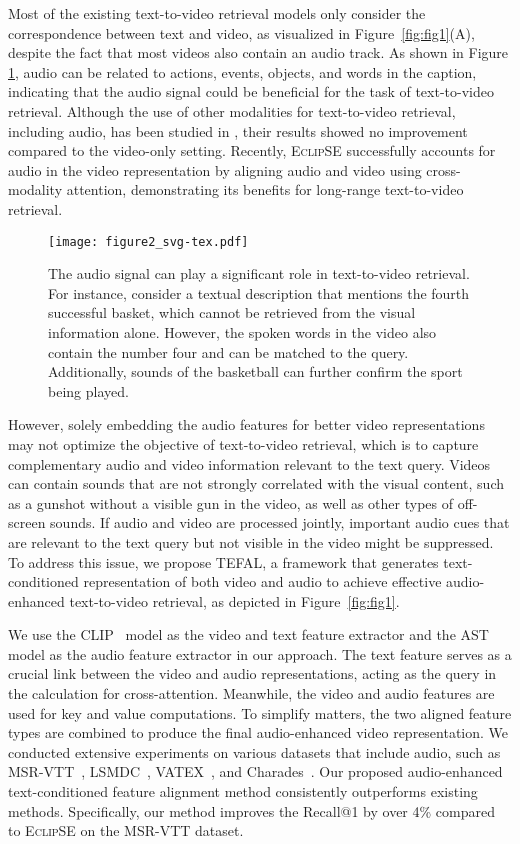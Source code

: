 \documentclass[10pt,twocolumn,letterpaper]{article}
\begin{document}
Most of the existing text-to-video retrieval models only consider the correspondence between text and video, as visualized in Figure~\ref{fig:fig1}(A), despite the fact that most videos also contain an audio track. As shown in Figure \ref{fig:figw}, audio can be related to actions, events, objects, and words in the caption, indicating that the audio signal could be beneficial for the task of text-to-video retrieval. Although the use of other modalities for text-to-video retrieval, including audio, has been studied in \cite{everythingatonce}, their results showed no improvement compared to the video-only setting. Recently, E\textsc{clip}SE \cite{ECLIPSE_ECCV22} successfully accounts for audio in the video representation by aligning audio and video using cross-modality attention, demonstrating its benefits for long-range text-to-video retrieval.

 \begin{figure}[t]
   \centering
   \texttt{[image: figure2\_svg-tex.pdf]}
   \caption{The audio signal can play a significant role in text-to-video retrieval. For instance, consider a textual description that mentions the fourth successful basket, which cannot be retrieved from the visual information alone. However, the spoken words in the video also contain the number four and can be matched to the query. Additionally, sounds of the basketball can further confirm the sport being played.}
   \label{fig:figw}
  \end{figure}

 
However, solely embedding the audio features for better video representations may not optimize the objective of text-to-video retrieval, which is to capture complementary audio and video information relevant to the text query. Videos can contain sounds that are not strongly correlated with the visual content, such as a gunshot without a visible gun in the video, as well as other types of off-screen sounds. If audio and video are processed jointly, important audio cues that are relevant to the text query but not visible in the video might be suppressed. To address this issue, we propose TEFAL, a framework that generates text-conditioned representation of both video and audio to achieve effective audio-enhanced text-to-video retrieval, as depicted in Figure~\ref{fig:fig1}. 

We use the CLIP~\cite{clip} model as the video and text feature extractor and the AST~\cite{gong21b_interspeech} model as the audio feature extractor in our approach. The text feature serves as a crucial link between the video and audio representations, acting as the query in the calculation for cross-attention. Meanwhile, the video and audio features are used for key and value computations. To simplify matters, the two aligned feature types are combined to produce the final audio-enhanced video representation. We conducted extensive experiments on various datasets that include audio, such as MSR-VTT~\cite{msrvtt}, LSMDC~\cite{lsmdc}, VATEX~\cite{vatex}, and Charades~\cite{charades}. Our proposed audio-enhanced text-conditioned feature alignment method consistently outperforms existing methods. Specifically, our method improves the Recall@1 by over 4\% compared to E\textsc{clip}SE on the MSR-VTT dataset. 
\end{document}
